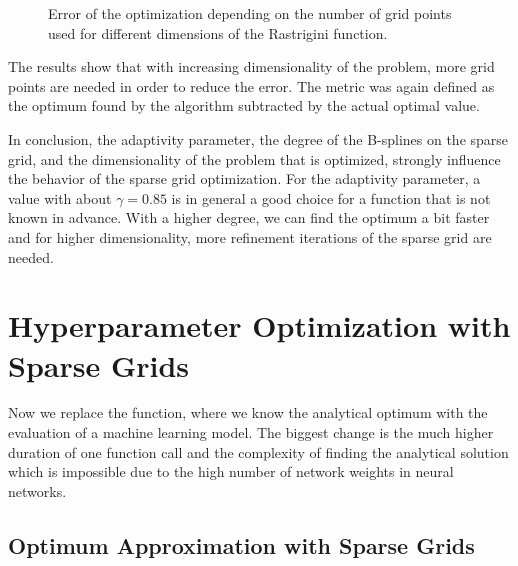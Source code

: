 \begin{figure}[htbp!]
	\caption{ Error of the optimization depending on the number of grid points used for different dimensions of the Rastrigini function. }	
	\label{fig:Dimensions_results}
\end{figure}

The results show that with increasing dimensionality of the problem, more grid points are needed in order to reduce the error. The metric was again defined as the optimum found by the algorithm subtracted by the actual optimal value. \newline 

In conclusion, the adaptivity parameter, the degree of the B-splines on the sparse grid, and the dimensionality of the problem that is optimized, strongly influence the behavior of the sparse grid optimization. For the adaptivity parameter, a value with about $ \gamma = 0.85 $ is in general a good choice for a function that is not known in advance. With a higher degree, we can find the optimum a bit faster and for higher dimensionality, more refinement iterations of the sparse grid are needed. 


\section{Hyperparameter Optimization with Sparse Grids}

Now we replace the function, where we know the analytical optimum with the evaluation of a machine learning model. The biggest change is the much higher duration of one function call and the complexity of finding the analytical solution which is impossible due to the high number of network weights in neural networks. 

\subsection{Optimum Approximation with Sparse Grids}

